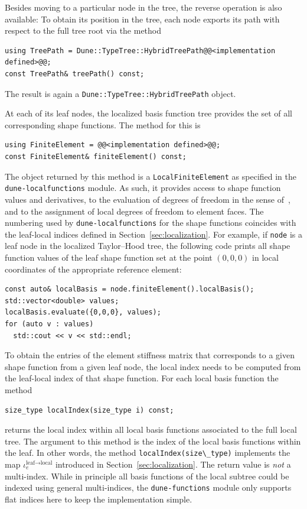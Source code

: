 \documentclass[a4paper,10pt,headings=normal,bibliography=totoc]{scrartcl}
\newcommand{\cpp}[1]{\lstinline[basicstyle=\ttfamily]!#1!}
\newcommand{\dunemodule}[1]{\texttt{#1}}
\begin{document}
Besides moving to a particular node in the tree, the reverse operation is also
available: To obtain its position in the tree, each node
exports its path with respect to the full tree root
via the  method
\begin{lstlisting}[style=Interface]
using TreePath = Dune::TypeTree::HybridTreePath@@<implementation defined>@@;
const TreePath& treePath() const;
\end{lstlisting}
The result is again a \cpp{Dune::TypeTree::HybridTreePath} object.

At each of its leaf nodes, the localized basis function tree provides the set
of all corresponding shape functions.
The method for this is
\begin{lstlisting}[style=Interface]
using FiniteElement = @@<implementation defined>@@;
const FiniteElement& finiteElement() const;
\end{lstlisting}
The object returned by this method is a \cpp{LocalFiniteElement} as specified
in the \dunemodule{dune-localfunctions} module. As such, it provides access
to shape function values and derivatives, to the evaluation of degrees of freedom
in the sense of~\cite{ciarlet:1978}, and to the assignment of local degrees of
freedom to element faces.
The numbering used by \dunemodule{dune-localfunctions} for the shape functions
coincides with the leaf-local indices defined in Section~\ref{sec:localization}.
For example, if \cpp{node} is a leaf node in the localized Taylor--Hood tree,
the following code prints all shape function values of the leaf shape function set
at the point $(0,0,0)$ in local coordinates of the appropriate reference element:
%
\begin{lstlisting}[style=Example]
const auto& localBasis = node.finiteElement().localBasis();
std::vector<double> values;
localBasis.evaluate({0,0,0}, values);
for (auto v : values)
  std::cout << v << std::endl;
\end{lstlisting}
%

To obtain the entries of the element stiffness matrix that corresponds to a
given shape function from a given leaf node, the local index needs to be computed
from the leaf-local index of that shape function.
For each local basis function the method
\begin{lstlisting}[style=Interface]
size_type localIndex(size_type i) const;
\end{lstlisting}
returns the
local index within all local basis functions associated to the full
local tree.
The argument to this method is the
index of the local basis functions within the leaf.
In other words, the method \cpp{localIndex(size\_type)}
implements the map $\iota^{\text{leaf}\to\text{local}}_e$
introduced in Section~\ref{sec:localization}.
The return value is \emph{not} a multi-index.
While in principle all basis functions of the local subtree could be indexed using
general multi-indices, the \dunemodule{dune-functions} module only supports
flat indices here to keep the implementation simple.
\end{document}
